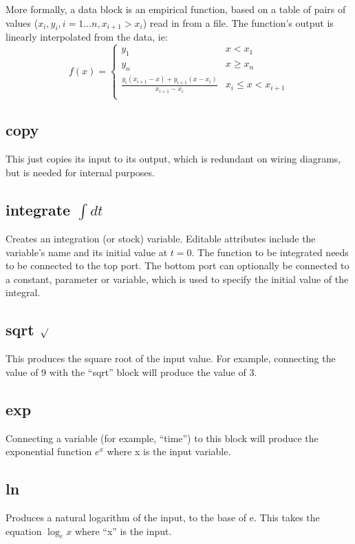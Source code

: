 More formally, a data block is an empirical function, based on a table
of pairs of values ($x_i, y_i, i=1\ldots n, x_{i+1}>x_i$) read in from
a file. The function's output is linearly interpolated from the data,
ie:
\begin{displaymath}
f(x) = \left\{
\begin{array}{cl}
y_1 & x < x_1\\
y_n & x\geq x_n\\
\frac{y_i(x_{i+1}-x)+y_{i+1}(x-x_i)}{x_{i+1}-x_i} & x_i \leq x <
x_{i+1}\\
\end{array}
\right.
\end{displaymath}

\subsection{copy}\label{Operation:copy} This just copies its input to its output,
which is redundant on wiring diagrams, but is needed for internal
purposes.

\subsection{integrate $\int dt$}\label{IntOp}  Creates an integration (or stock)
variable. Editable attributes include the variable's name and its
initial value at $t=0$. The function to be integrated needs to be
connected to the top port. The bottom port can optionally be connected
to a constant, parameter or variable, which is used to specify the
initial value of the integral.

\subsection{sqrt $\surd$}\label{Operation:sqrt} This produces the square root of 
the input value. For example, connecting the value of 9 with the ``sqrt'' block will
produce the value of 3.

\subsection{exp}\label{Operation:exp} Connecting a variable (for example, ``time'')
to this block will produce the exponential function $e^{x}$ where x is the input variable. 

\subsection{ln}\label{Operation:ln} Produces a natural logarithm of the input, to the base of e.
This takes the equation $\log_{e} x$ where ``x'' is the input.

